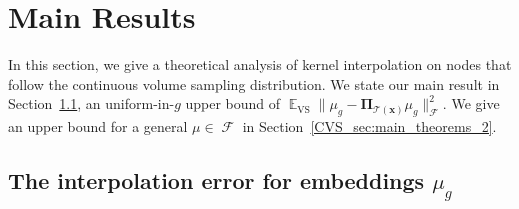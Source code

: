 \documentclass[twoside,11pt]{book}
\numberwithin{theorem}{chapter}
\numberwithin{definition}{chapter}
\numberwithin{proposition}{chapter}
\numberwithin{corollary}{chapter}
\numberwithin{example}{chapter}
\numberwithin{lemma}{chapter}
\numberwithin{assumption}{chapter}
\numberwithin{equation}{chapter}
\numberwithin{figure}{chapter}
\DeclareMathOperator{\VS}{\mathrm{VS}}
\DeclareMathOperator{\EX}{\mathbb{E}}
\DeclareMathOperator{\F}{\mathcal{F}}
\def\Ltwo{\mathbb{L}_{2}(\mathrm{d} \omega)}
\newcommand{\pc}[1]{\textcolor{blue}{#1}}
\begin{document}



\section{Main Results}\label{CVS_sec:main_results}
In this section, we give a theoretical analysis of kernel interpolation on nodes that follow the continuous volume sampling distribution. We state our main result in Section~\ref{CVS_sec:main_theorems}, an uniform-in-$g$ upper bound of $\EX_{\VS} \|\mu_{g} - \bm{\Pi}_{\mathcal{T}(\bm{x})} \mu_{g}\|_{\F}^{2}$. We give an upper bound for a general $\mu \in \F$ in Section~\ref{CVS_sec:main_theorems_2}.





\subsection{The interpolation error for embeddings $\mu_{g}$}\label{CVS_sec:main_theorems}
%
%
\end{document}
